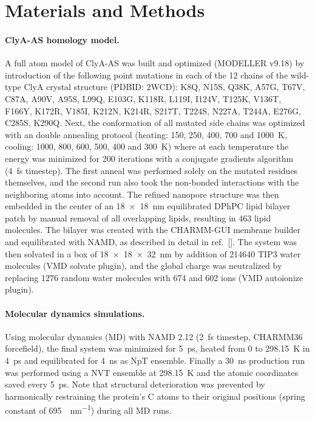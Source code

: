 \documentclass[journal=ancac3,manuscript=article,etalmode=truncate,maxauthors=0,layout=onecolumn]{achemso}
\begin{document}
%
%
\section{Materials and Methods}\label{sec:methods}

\paragraph{ClyA-AS homology model.}
%
A full atom model of ClyA-AS\cite{Soskine-2013} was built and optimized (MODELLER v9.18\cite{Sali-1993}) by
introduction of the following point mutations in each of the 12 chains of the wild-type ClyA crystal structure
(PDBID: 2WCD\cite{Mueller-2009}): K8Q, N15S, Q38K, A57G, T67V, C87A, A90V, A95S, L99Q, E103G, K118R, L119I,
I124V, T125K, V136T, F166Y, K172R, V185I, K212N, K214R, S217T, T224S, N227A, T244A, E276G, C285S, K290Q. Next,
the conformation of all mutated side chains was optimized with an double annealing protocol (heating: 150,
250, 400, 700 and \SI{1000}{\kelvin}, cooling: 1000, 800, 600, 500, 400 and \SI{300}{\kelvin}) where at each
temperature the energy was minimized for 200 iterations with a conjugate gradients algorithm (\SI{4}{\fs}
timestep).\cite{Shanno-1980} The first anneal was performed solely on the mutated residues themselves, and the
second run also took the non-bonded interactions with the neighboring atoms into account. The refined nanopore
structure was then embedded in the center of an \SI{18x18}{\nm} equilibrated DPhPC lipid bilayer patch by
manual removal of all overlapping lipids, resulting in 463 lipid molecules. The bilayer was created with the
CHARMM-GUI\cite{Jo-2008} membrane builder\cite{Lee-2016} and equilibrated with NAMD\cite{Phillips-2005}, as
described in detail in ref.~[]. The system was then solvated in a box of \SI{18x18x32}{\nm}
by addition of 214640 TIP3 water molecules (VMD solvate plugin), and the global charge was neutralized by
replacing 1276 random water molecules with 674 \Na{} and 602 \Cl{} ions (VMD autoionize
plugin).\cite{Humphrey-1996}

\paragraph{Molecular dynamics simulations.}
%
Using molecular dynamics (MD) with NAMD 2.12 (\SI{2}{\fs} timestep, CHARMM36 forcefield\cite{Best-2012}), the
final system was minimized for \SI{5}{\ps}, heated from 0 to \SI{298.15}{\kelvin} in \SI{4}{\ps} and
equilibrated for \SI{4}{\ns} as NpT ensemble.\cite{Aksimentiev-2005} Finally a \SI{30}{\ns} production run was
performed using a NVT ensemble at \SI{298.15}{\kelvin} and the atomic coordinates saved every \SI{5}{\ps}.
Note that structural deterioration was prevented by harmonically restraining the protein's C\textalpha{} atoms
to their original positions (spring constant of \SI{695}{\pN\per\nm}) during all MD
runs.\cite{Bhattacharya-2011}
\end{document}
